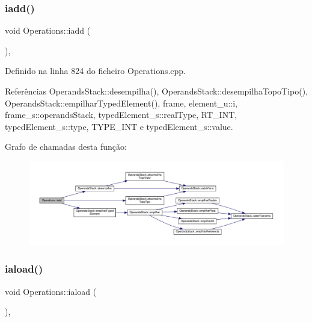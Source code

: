 \subsubsection{\texorpdfstring{iadd()}{iadd()}}
{\footnotesize\ttfamily void Operations\+::iadd (\begin{DoxyParamCaption}{ }\end{DoxyParamCaption})\hspace{0.3cm}{\ttfamily [static]}, {\ttfamily [private]}}



Definido na linha 824 do ficheiro Operations.\+cpp.



Referências Operands\+Stack\+::desempilha(), Operands\+Stack\+::desempilha\+Topo\+Tipo(), Operands\+Stack\+::empilhar\+Typed\+Element(), frame, element\+\_\+u\+::i, frame\+\_\+s\+::operands\+Stack, typed\+Element\+\_\+s\+::real\+Type, R\+T\+\_\+\+I\+NT, typed\+Element\+\_\+s\+::type, T\+Y\+P\+E\+\_\+\+I\+NT e typed\+Element\+\_\+s\+::value.

Grafo de chamadas desta função\+:\nopagebreak
\begin{figure}[H]
\begin{center}
\leavevmode
\includegraphics[width=350pt]{classOperations_a12d5933f0d0c91c578b76edb1971a2be_cgraph}
\end{center}
\end{figure}
\mbox{\label{classOperations_a77f3b4c161fee7fbd6bb89b170400c0c}} 
\subsubsection{\texorpdfstring{iaload()}{iaload()}}
{\footnotesize\ttfamily void Operations\+::iaload (\begin{DoxyParamCaption}{ }\end{DoxyParamCaption})\hspace{0.3cm}{\ttfamily [static]}, {\ttfamily [private]}}



